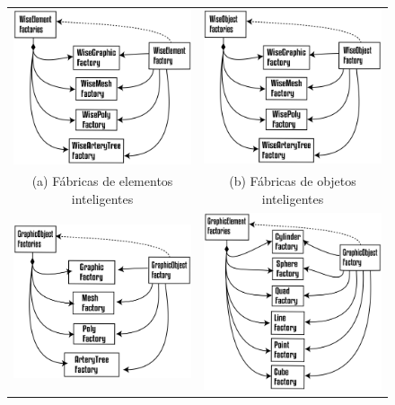 \begin{figure}
	\begin{tabularx}{\textwidth}{cc}
		\includegraphics[width=0.5\linewidth]{Figures/WiseElementFactories@16x.png} &   \includegraphics[width=0.5\linewidth]{Figures/WiseObjectFactories@16x.png} \\
		(a) Fábricas de elementos inteligentes & (b) Fábricas de objetos inteligentes \\[6pt]
		\includegraphics[width=0.5\linewidth]{Figures/GraphicObjectFactories@16x.png} &   \includegraphics[width=0.5\linewidth]{Figures/GraphicElementFactories@16x.png} \\

\end{tabularx}
\end{figure}
